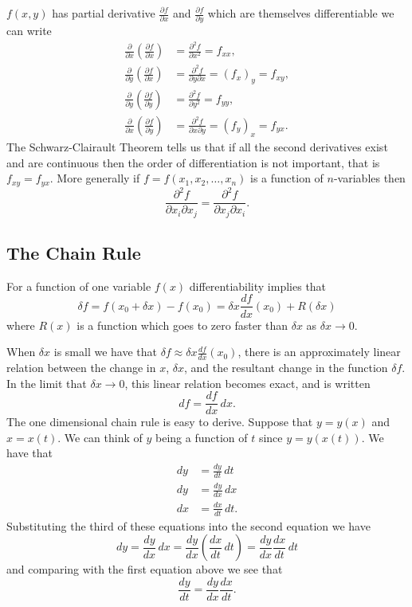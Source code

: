 \documentclass[10pt, a4paper]{article}
\begin{document}
$f(x, y)$ has partial derivative $\frac{\partial f}{\partial x}$ and $\frac{\partial f}{\partial y}$ which are themselves differentiable we can write
\begin{align*}
    \frac{\partial}{\partial x}\left(\frac{\partial f}{\partial x}\right) &= \frac{\partial ^ 2 f}{\partial x ^ 2} = f_{xx}, \\
    \frac{\partial}{\partial y}\left(\frac{\partial f}{\partial x}\right) &= \frac{\partial ^ 2 f}{\partial y \partial x} = (f_x)_y = f_{xy}, \\
    \frac{\partial}{\partial y}\left(\frac{\partial f}{\partial y}\right) &= \frac{\partial ^ 2 f}{\partial y ^ 2} = f_{yy}, \\
    \frac{\partial}{\partial x}\left(\frac{\partial f}{\partial y}\right) &= \frac{\partial ^ 2 f}{\partial x \partial y} = (f_y)_x = f_{yx}.
\end{align*}
The Schwarz-Clairault Theorem tells us that if all the second derivatives exist and are continuous then the order of differentiation is not important,
that is $f_{xy} = f_{yx}$.
More generally if $f = f(x_1, x_2, \dotsc, x_n)$ is a function of $n$-variables then
\[
\frac{\partial ^ 2f}{\partial x_i\partial x_j} = \frac{\partial ^ 2f}{\partial x_j\partial x_i}.
\]

\subsection{The Chain Rule}
For a function of one variable $f(x)$ differentiability implies that
\[
\delta f = f(x_0 + \delta x) - f(x_0) = \delta x\frac{df}{dx}(x_0) + R(\delta x)
\]
where $R(x)$ is a function which goes to zero faster than $\delta x$ as $\delta x \rightarrow 0$.

When $\delta x$ is small we have that $\delta f \approx \delta x\frac{df}{dx}(x_0)$,
there is an approximately linear relation between the change in $x$,
$\delta x$,
and the resultant change in the function $\delta f$.
In the limit that $\delta x \rightarrow 0$,
this linear relation becomes exact,
and is written
\[
df = \frac{df}{dx}\,dx.
\]
The one dimensional chain rule is easy to derive.
Suppose that $y = y(x)$ and $x = x(t)$.
We can think of $y$ being a function of $t$ since $y = y(x(t))$.
We have that
\begin{align*}
    dy &= \frac{dy}{dt}\,dt \\
    dy &= \frac{dy}{dx}\,dx \\
    dx &= \frac{dx}{dt}\,dt.
\end{align*}
Substituting the third of these equations into the second equation we have
\[
dy = \frac{dy}{dx}\,dx = \frac{dy}{dx}\left(\frac{dx}{dt}\,dt\right) = \frac{dy}{dx}\frac{dx}{dt}\,dt
\]
and comparing with the first equation above we see that
\[
\frac{dy}{dt} = \frac{dy}{dx}\frac{dx}{dt}.
\]
\end{document}
